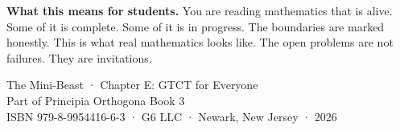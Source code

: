\documentclass[12pt, openright]{book}
\theoremstyle{definition}
\theoremstyle{remark}
\begin{document}
\textbf{What this means for students.}
You are reading mathematics that is alive. Some of it is
complete. Some of it is in progress. The boundaries are
marked honestly. This is what real mathematics looks like.
The open problems are not failures. They are invitations.

\vfill
\begin{center}
{\footnotesize\color{gray}
The Mini-Beast · Chapter E: GTCT for Everyone\\
Part of Principia Orthogona Book 3\\
ISBN 979-8-9954416-6-3 · G6 LLC · Newark, New Jersey · 2026
}
\end{center}
\end{document}
